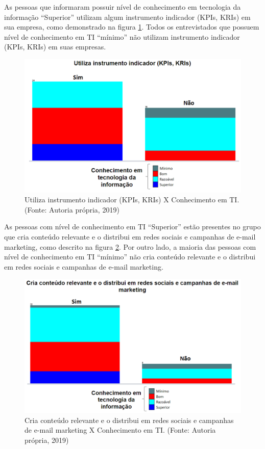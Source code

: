 As pessoas que informaram possuir nível de conhecimento em tecnologia da informação “Superior” utilizam algum instrumento indicador (KPIs, KRIs) em sua empresa, como demonstrado na figura \ref{fig:grafico411}. Todos os entrevistados que possuem nível de conhecimento em TI “mínimo” não utilizam instrumento indicador (KPIs, KRIs) em suas empresas.

\begin{figure}[H]

\centering
\includegraphics[width=13cm]{./fig/grafico08}
\caption{Utiliza instrumento indicador (KPIs, KRIs) X Conhecimento em TI. (Fonte: Autoria própria, 2019)}
\label{fig:grafico411}
\end{figure}

As pessoas com nível de conhecimento em TI “Superior” estão presentes no grupo que cria conteúdo relevante e o distribui em redes sociais e campanhas de e-mail marketing, como descrito na figura \ref{fig:grafico412}. Por outro lado, a maioria das pessoas com nível de conhecimento em TI “mínimo” não cria conteúdo relevante e o distribui em redes sociais e campanhas de e-mail marketing. 

\begin{figure}[H]

\centering
\includegraphics[width=13cm]{./fig/grafico09}
\caption{Cria conteúdo relevante e o distribui em redes sociais e campanhas de e-mail marketing X Conhecimento em TI. (Fonte: Autoria própria, 2019)}
\label{fig:grafico412}
\end{figure}

